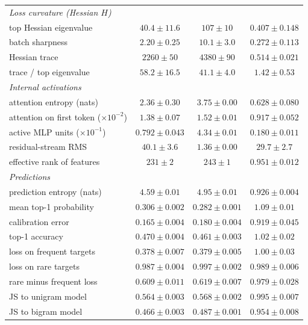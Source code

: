 \begin{center}
\begin{minipage}{\linewidth}
\begin{tabular}{@{}l|cc|c@{}}
\emph{Loss curvature (Hessian $H$)} & & & \\
top Hessian eigenvalue & $40.4 \pm 11.6$ & $107 \pm 10$ & $0.407 \pm 0.148$ \\
batch sharpness & $2.20 \pm 0.25$ & $10.1 \pm 3.0$ & $0.272 \pm 0.113$ \\
Hessian trace & $2260 \pm 50$ & $4380 \pm 90$ & $0.514 \pm 0.021$ \\
trace / top eigenvalue & $58.2 \pm 16.5$ & $41.1 \pm 4.0$ & $1.42 \pm 0.53$ \\
\emph{Internal activations} & & & \\
attention entropy (nats) & $2.36 \pm 0.30$ & $3.75 \pm 0.00$ & $0.628 \pm 0.080$ \\
attention on first token ($\times10^{-2}$) & $1.38 \pm 0.07$ & $1.52 \pm 0.01$ & $0.917 \pm 0.052$ \\
active MLP units ($\times10^{-1}$) & $0.792 \pm 0.043$ & $4.34 \pm 0.01$ & {\boldmath\textbf{$0.180 \pm 0.011$}} \\
residual-stream RMS & $40.1 \pm 3.6$ & $1.36 \pm 0.00$ & {\boldmath\textbf{$29.7 \pm 2.7$}} \\
effective rank of features & $231 \pm 2$ & $243 \pm 1$ & $0.951 \pm 0.012$ \\
\emph{Predictions} & & & \\
prediction entropy (nats) & $4.59 \pm 0.01$ & $4.95 \pm 0.01$ & $0.926 \pm 0.004$ \\
mean top-1 probability & $0.306 \pm 0.002$ & $0.282 \pm 0.001$ & $1.09 \pm 0.01$ \\
calibration error & $0.165 \pm 0.004$ & $0.180 \pm 0.004$ & $0.919 \pm 0.045$ \\
top-1 accuracy & $0.470 \pm 0.004$ & $0.461 \pm 0.003$ & $1.02 \pm 0.02$ \\
loss on frequent targets & $0.378 \pm 0.007$ & $0.379 \pm 0.005$ & $1.00 \pm 0.03$ \\
loss on rare targets & $0.987 \pm 0.004$ & $0.997 \pm 0.002$ & $0.989 \pm 0.006$ \\
rare minus frequent loss & $0.609 \pm 0.011$ & $0.619 \pm 0.007$ & $0.979 \pm 0.028$ \\
JS to unigram model & $0.564 \pm 0.003$ & $0.568 \pm 0.002$ & $0.995 \pm 0.007$ \\
JS to bigram model & $0.466 \pm 0.003$ & $0.487 \pm 0.001$ & $0.954 \pm 0.008$ \\
\end{tabular}\end{minipage}
\end{center}

